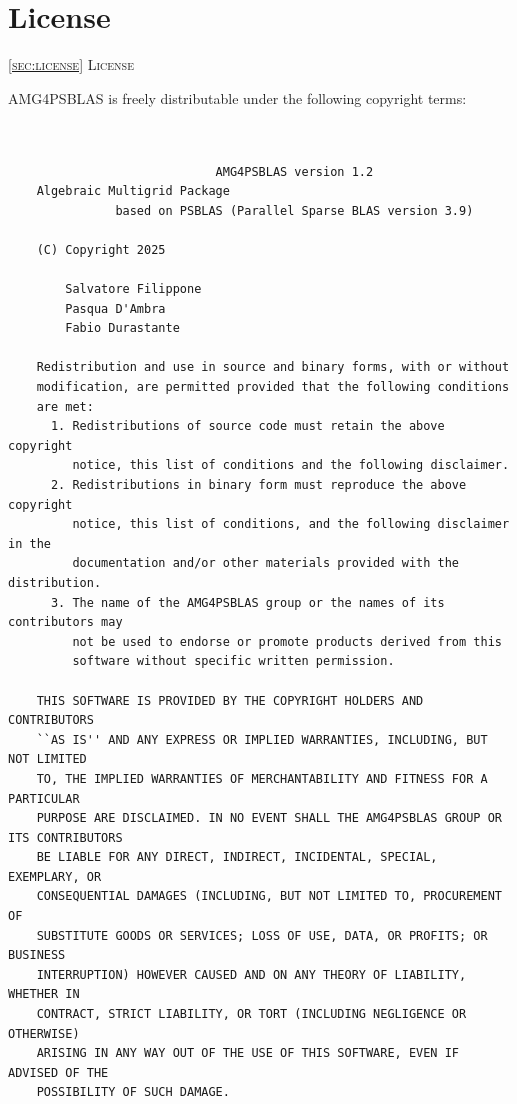 \section{License\label{sec:license}}
         {\textsc{\ref{sec:license} License}}


 AMG4PSBLAS is freely distributable under the following copyright
terms: {\small
\begin{verbatim}
  
   
                             AMG4PSBLAS version 1.2
    Algebraic Multigrid Package
               based on PSBLAS (Parallel Sparse BLAS version 3.9)
    
    (C) Copyright 2025
  
        Salvatore Filippone  
        Pasqua D'Ambra   
        Fabio Durastante        
   
    Redistribution and use in source and binary forms, with or without
    modification, are permitted provided that the following conditions
    are met:
      1. Redistributions of source code must retain the above copyright
         notice, this list of conditions and the following disclaimer.
      2. Redistributions in binary form must reproduce the above copyright
         notice, this list of conditions, and the following disclaimer in the
         documentation and/or other materials provided with the distribution.
      3. The name of the AMG4PSBLAS group or the names of its contributors may
         not be used to endorse or promote products derived from this
         software without specific written permission.
   
    THIS SOFTWARE IS PROVIDED BY THE COPYRIGHT HOLDERS AND CONTRIBUTORS
    ``AS IS'' AND ANY EXPRESS OR IMPLIED WARRANTIES, INCLUDING, BUT NOT LIMITED
    TO, THE IMPLIED WARRANTIES OF MERCHANTABILITY AND FITNESS FOR A PARTICULAR
    PURPOSE ARE DISCLAIMED. IN NO EVENT SHALL THE AMG4PSBLAS GROUP OR ITS CONTRIBUTORS
    BE LIABLE FOR ANY DIRECT, INDIRECT, INCIDENTAL, SPECIAL, EXEMPLARY, OR
    CONSEQUENTIAL DAMAGES (INCLUDING, BUT NOT LIMITED TO, PROCUREMENT OF
    SUBSTITUTE GOODS OR SERVICES; LOSS OF USE, DATA, OR PROFITS; OR BUSINESS
    INTERRUPTION) HOWEVER CAUSED AND ON ANY THEORY OF LIABILITY, WHETHER IN
    CONTRACT, STRICT LIABILITY, OR TORT (INCLUDING NEGLIGENCE OR OTHERWISE)
    ARISING IN ANY WAY OUT OF THE USE OF THIS SOFTWARE, EVEN IF ADVISED OF THE
    POSSIBILITY OF SUCH DAMAGE.

\end{verbatim}
}
